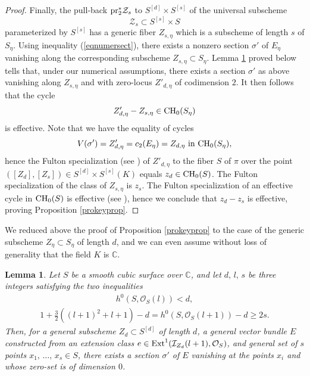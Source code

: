 \documentclass[10pt]{article}
\newtheorem{lemm}[theo]{Lemma}
\begin{document}
\begin{proof}
Finally, the pull-back ${\rm pr}_2^*\mathcal{Z}_s$ to $S^{[d]}\times S^{[s]}$ of the universal subscheme
$$\mathcal{Z}_s\subset S^{[s]}\times S$$
parameterized by $S^{[s]}$ has a generic fiber $Z_{s, \eta}$ which is a subscheme of length $s$ of $S_\eta$. Using inequality (\ref{eqnumersect}), there exists a nonzero section $\sigma'$ of $E_\eta$ vanishing along the corresponding subscheme $Z_{s,\eta}\subset S_\eta$.
 Lemma \ref{lecasgeneric} proved below tells that, under our numerical assumptions,   there exists a section $\sigma'$ as above vanishing along $Z_{s,\eta}$ and with zero-locus $Z'_{d,\eta}$ of codimension $2$. It then follows that the cycle $$Z'_{d,\eta}-Z_{s,\eta}\in {\rm CH}_0(S_\eta)$$ is effective. Note that
 we have the equality of cycles
 $$V(\sigma')=Z'_{d,\eta}=c_2(E_\eta)=Z_{d,\eta}\,\,{\rm in}\,\,{\rm CH}_0(S_\eta),$$
 hence the Fulton specialization (see \cite[10.3]{fulton}) of $Z'_{d,\eta}$ to the fiber $S$ of $\pi$ over the point $([Z_d],[Z_s])\in S^{[d]}\times S^{[s]}(K)$  equals $z_d\in{\rm CH}_0(S)$. The Fulton specialization of the class of $Z_{s,\eta}$ is $z_{s}$.
The Fulton specialization of an effective cycle in $ {\rm CH}_0(S)$ is effective (see \cite[Lemme 2.10]{colliot}), hence we conclude that $z_d-z_s$ is effective, proving Proposition \ref{prokeyprop}.
\end{proof}
We reduced above the proof of Proposition  \ref{prokeyprop} to the case of the generic subscheme $Z_\eta\subset S_\eta$ of length $d$, and we can even assume without loss of generality that the field $K$ is  $\mathbb{C}$.
\begin{lemm} \label{lecasgeneric} Let $S$ be a smooth cubic surface over $\mathbb{C}$, and let $d,\,l,\,s$ be three integers satisfying the two inequalities
\begin{eqnarray}\label{eqineqassump} h^0(S,\mathcal{O}_S(l))<d,\end{eqnarray}
\begin{eqnarray}\label{eqineqassump2}1+\frac{3}{2}((l+1)^2+l+1)-d=h^0(S,\mathcal{O}_S(l+1))-d\geq 2s.
\end{eqnarray}
Then, for a general subscheme
$Z_d\subset S^{[d]}$ of length $d$, a general vector bundle $E$ constructed from an extension class $e\in {\rm Ext}^1(\mathcal{I}_{Z_d}(l+1),\mathcal{O}_S)$, and general set of $s$ points $x_1,\,\ldots,\,x_s\in S$, there exists a section $\sigma'$ of $E$ vanishing at the points $x_i$ and whose zero-set is of dimension $0$.
\end{lemm}
\end{document}

